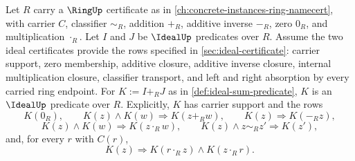 \begin{theorem}
\label{thm:ideal-sum-closure}
Let $R$ carry a $\RingUp$ certificate as in \autoref{ch:concrete-instances-ring-namecert}, with carrier $C$, classifier $\sim_R$, addition $+_R$, additive inverse $-_R$, zero $0_R$, and multiplication $\cdot_R$. Let $I$ and $J$ be $\IdealUp$ predicates over $R$. Assume the two ideal certificates provide the rows specified in \autoref{sec:ideal-certificate}: carrier support, zero membership, additive closure, additive inverse closure, internal multiplication closure, classifier transport, and left and right absorption by every carried ring endpoint. For $K:=I+_RJ$ as in \autoref{def:ideal-sum-predicate}, $K$ is an $\IdealUp$ predicate over $R$. Explicitly, $K$ has carrier support and the rows
$$
K(0_R),\qquad
K(z)\land K(w)\Longrightarrow K(z+_R w),\qquad
K(z)\Longrightarrow K(-_R z),
$$
$$
K(z)\land K(w)\Longrightarrow K(z\cdot_R w),\qquad
K(z)\land z\sim_R z'\Longrightarrow K(z'),
$$
and, for every $r$ with $C(r)$,
$$
K(z)\Longrightarrow K(r\cdot_R z)\land K(z\cdot_R r).
$$
\end{theorem}
